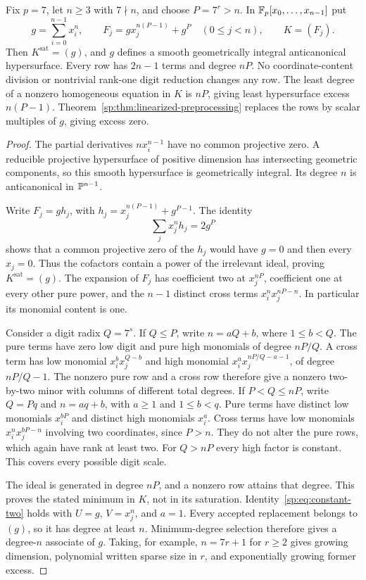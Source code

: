 \begin{example}
\label{sp:ex:constant-field-family}
Fix $p=7$, let $n\ge3$ with $7\nmid n$, and choose $P=7^r>n$.
In $\mathbb F_p[x_0,\ldots,x_{n-1}]$ put
\[
 g=\sum_{i=0}^{n-1}x_i^n,\qquad
 F_j=gx_j^{n(P-1)}+g^P\quad(0\le j<n),\qquad K=(F_j).
\]
Then $K^{\mathrm{sat}}=(g)$, and $g$ defines a smooth geometrically
integral anticanonical hypersurface. Every row has $2n-1$ terms and
degree $nP$. No coordinate-content division or nontrivial rank-one
digit reduction changes any row. The least degree of a nonzero
homogeneous equation in $K$ is $nP$, giving least hypersurface excess
$n(P-1)$. Theorem~\ref{sp:thm:linearized-preprocessing} replaces
the rows by scalar multiples of $g$, giving excess zero.
\end{example}
\begin{proof}
The partial derivatives $n x_i^{n-1}$ have no common projective zero.
A reducible projective hypersurface of positive dimension has
intersecting geometric components, so this smooth hypersurface is
geometrically integral. Its degree $n$ is anticanonical in
$\mathbb P^{n-1}$.

Write $F_j=gh_j$, with $h_j=x_j^{n(P-1)}+g^{P-1}$. The identity
\[
 \sum_jx_j^n h_j=2g^P
\]
shows that a common projective zero of the $h_j$ would have $g=0$
and then every $x_j=0$. Thus the cofactors contain a power of the
irrelevant ideal, proving $K^{\mathrm{sat}}=(g)$.
The expansion of $F_j$ has coefficient two at $x_j^{nP}$,
coefficient one at every other pure power, and the $n-1$ distinct
cross terms $x_i^n x_j^{nP-n}$. In particular its monomial content is
one.

Consider a digit radix $Q=7^s$. If $Q\le P$, write $n=aQ+b$,
where $1\le b<Q$. The pure terms have zero low digit and pure high
monomials of degree $nP/Q$. A cross term has low monomial
$x_i^b x_j^{Q-b}$ and high monomial
$x_i^a x_j^{nP/Q-a-1}$, of degree $nP/Q-1$.
The nonzero pure row and a cross row therefore give a nonzero
two-by-two minor with columns of different total degrees. If
$P<Q\le nP$, write $Q=Pq$ and $n=aq+b$, with $a\ge1$ and
$1\le b<q$. Pure terms have distinct low monomials $x_i^{bP}$ and
distinct high monomials $x_i^a$. Cross terms have low monomials
$x_i^n x_j^{bP-n}$ involving two coordinates, since $P>n$.
They do not alter the pure rows, which again have rank at least two.
For $Q>nP$ every high factor is constant. This covers every possible
digit scale.

The ideal is generated in degree $nP$, and a nonzero row attains that
degree. This proves the stated minimum in $K$, not in its saturation.
Identity~\eqref{sp:eq:constant-two} holds with $U=g$, $V=x_j^n$,
and $a=1$. Every accepted replacement belongs to $(g)$, so it has
degree at least $n$. Minimum-degree selection therefore gives a
degree-$n$ associate of $g$. Taking, for example, $n=7r+1$ for
$r\ge2$ gives growing dimension, polynomial written sparse size in
$r$, and exponentially growing former excess.


\end{proof}
